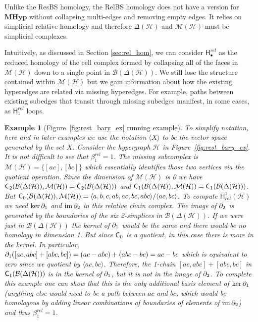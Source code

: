 \documentclass{amsart}
\newtheorem{example}[theorem]{Example}
\newcommand{\MHyp}{\mathrm{\textbf{MHyp}}}
\newcommand{\Cgroup}        {\mm{\sf C}}
\newcommand{\Hgroup}	     {\mathsf{H}}
\renewcommand{\hom}[2]{\Hgroup_{#2}^{#1}}
\newcommand{\betti}[2]{\beta_{#2}^{#1}}
\renewcommand{\H}{\mathcal{H}}
\newcommand{\bary}{\mathcal{B}}
\newcommand{\missing}{\mathcal{M}}
\DeclareMathOperator{\im}{im}
\newcommand{\bdr}{\mm{\mathrm{\partial}}}
\newcommand {\mm}[1]        {\ifmmode{#1}\else{\mbox{\(#1\)}}\fi}
\begin{document}
Unlike the ResBS homology, the RelBS homology does not have a version for $\MHyp$ without collapsing multi-edges and removing empty edges. 
It relies on simplicial relative homology and therefore $\Delta(\H)$ and $\missing(\H)$ must be simplicial complexes.

Intuitively, as discussed in Section \ref{sec:rel_hom}, we can consider $\hom{rel}{\bullet}$ as the reduced homology of the cell complex formed by collapsing all of the faces in $\missing(\H)$ down to a single point in $\bary(\Delta(\H))$. 
We still lose the structure contained within $\missing(\H)$ but we gain information about how the existing hyperedges are related via missing hyperedges.
For example, paths between existing subedges that transit through missing subedges manifest, in some cases, as $\hom{rel}{1}$ loops. 

\begin{example}[Figure~\ref{fig:rest_bary_ex} running example]
    To simplify notation, here and in later examples we use the notation $\langle X \rangle$ to be the vector space generated by the set $X$. 
    Consider the hypergraph $\H$ in Figure~\ref{fig:rest_bary_ex}.
    It is not difficult to see that $\betti{rel}{1} = 1$. 
    The missing subcomplex is $\missing(\H) = \{[ac], [bc]\}$ which essentially identifies those two vertices via the quotient operation.
    Since the dimension of $\missing(\H)$ is 0 we have $\Cgroup_2(\bary(\Delta(\H)), \missing(\H)) = \Cgroup_2(\bary(\Delta(\H)))$ and $\Cgroup_1(\bary(\Delta(\H)), \missing(\H)) = \Cgroup_1(\bary(\Delta(\H)))$. But $\Cgroup_0(\bary(\Delta(\H)), \missing(\H)) = \langle a, b, c, ab, ac, bc, abc \rangle / \langle ac, bc \rangle$. 
    To compute $\hom{1}{rel}(\H)$ we need $\ker \bdr_1$ and $\im \bdr_2$ in this relative chain complex. The image of $\bdr_2$ is generated by the boundaries of the six 2-simplices in $\bary(\Delta(\H))$. If we were just in $\bary(\Delta(\H))$ the kernel of $\bdr_1$ would be the same and there would be no homology in dimension 1. But since $\Cgroup_0$ is a quotient, in this case there is more in the kernel. In particular, $\bdr_1([ac, abc] + [abc, bc]) = (ac-abc)+(abc-bc) = ac-bc$ which is equivalent to zero since we quotient by $\langle ac, bc \rangle$.
    Therefore, the 1-chain $[ac, abc] + [abc, bc]$ in $\Cgroup_1(\bary(\Delta(\H)))$ is in the kernel of $\bdr_1$, but it is not in the image of $\bdr_2$. To complete this example one can show that this is the only additional basis element of $\ker\bdr_1$ (anything else would need to be a path between $ac$ and $bc$, which would be homologous by adding linear combinations of boundaries of elements of $\im\bdr_2$) and thus $\betti{rel}{1} = 1$.
\end{example}
\end{document}
